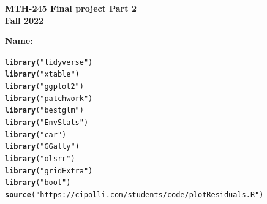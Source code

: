 \documentclass{article}\usepackage[]{graphicx}\usepackage[]{xcolor}
\makeatletter
\newcommand{\hlstr}[1]{\textcolor[rgb]{0.192,0.494,0.8}{#1}}%
\newcommand{\hlstd}[1]{\textcolor[rgb]{0.345,0.345,0.345}{#1}}%
\newcommand{\hlkwd}[1]{\textcolor[rgb]{0.737,0.353,0.396}{\textbf{#1}}}%
\newenvironment{kframe}{%
 \def\at@end@of@kframe{}%
 \ifinner\ifhmode%
  \def\at@end@of@kframe{\end{minipage}}%
  \begin{minipage}{\columnwidth}%
 \fi\fi%
 \def\FrameCommand##1{\hskip\@totalleftmargin \hskip-\fboxsep
 \colorbox{shadecolor}{##1}\hskip-\fboxsep
     \hskip-\linewidth \hskip-\@totalleftmargin \hskip\columnwidth}%
 \MakeFramed {\advance\hsize-\width
   \@totalleftmargin\z@ \linewidth\hsize
   \@setminipage}}%
 {\par\unskip\endMakeFramed%
 \at@end@of@kframe}
\newenvironment{knitrout}{}{} %
\makeatother
\begin{document}
\begin{center}
\textbf{MTH-245 Final project Part 2} \\
\textbf{Fall 2022}\\
\end{center}

\vspace{.3cm}

\textbf{Name: } 

\vspace{.3cm}

\begin{knitrout}
\color{fgcolor}\begin{kframe}
\begin{alltt}
\hlkwd{library}\hlstd{(}\hlstr{"tidyverse"}\hlstd{)}
\hlkwd{library}\hlstd{(}\hlstr{"xtable"}\hlstd{)}
\hlkwd{library}\hlstd{(}\hlstr{"ggplot2"}\hlstd{)}
\hlkwd{library}\hlstd{(}\hlstr{"patchwork"}\hlstd{)}
\hlkwd{library}\hlstd{(}\hlstr{"bestglm"}\hlstd{)}
\hlkwd{library}\hlstd{(}\hlstr{"EnvStats"}\hlstd{)}
\hlkwd{library}\hlstd{(}\hlstr{"car"}\hlstd{)}
\hlkwd{library}\hlstd{(}\hlstr{"GGally"}\hlstd{)}
\hlkwd{library}\hlstd{(}\hlstr{"olsrr"}\hlstd{)}
\hlkwd{library}\hlstd{(}\hlstr{"gridExtra"}\hlstd{)}
\hlkwd{library}\hlstd{(}\hlstr{"boot"}\hlstd{)}
\hlkwd{source}\hlstd{(}\hlstr{"https://cipolli.com/students/code/plotResiduals.R"}\hlstd{)}
\end{alltt}
\end{kframe}
\end{knitrout}
\end{document}
